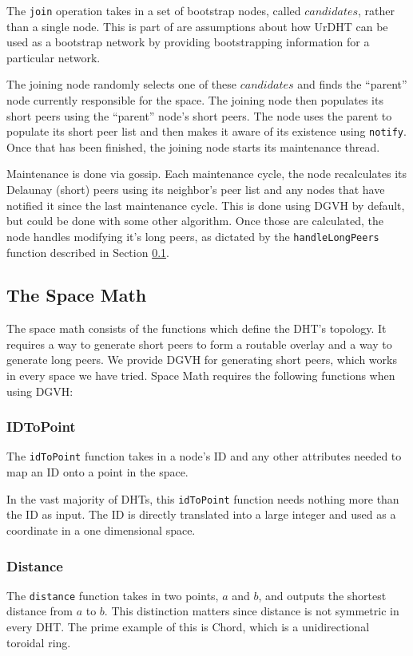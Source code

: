 \documentclass[11pt,conference]{IEEEtran}
\begin{document}
The \texttt{join} operation takes in a set of bootstrap nodes, called $ candidates $, rather than a single node.
This is part of are assumptions about how UrDHT can be used as a bootstrap network by providing bootstrapping information for a particular network.

The joining node randomly selects one of these $ candidates $ and finds the ``parent'' node currently responsible for the space.
The joining node then populates its short peers using the ``parent'' node's short peers.
The node  uses the parent to populate its short peer list and then makes it aware of its existence using \texttt{notify}.
Once that has been finished, the joining node starts its maintenance thread.



Maintenance is done via gossip.
Each maintenance cycle, the node recalculates its Delaunay (short) peers using its neighbor's peer list and any nodes that have notified it since the last maintenance cycle.
This is done using DGVH by default, but could be done with some other algorithm.
Once those are calculated, the node handles modifying it's long peers, as dictated by the \texttt{handleLongPeers} function described in Section \ref{sec:space}.

\subsection{The Space Math}
\label{sec:space}
The space math consists of the functions which define the DHT's topology.
It requires a way to generate short peers to form a routable overlay and a way to generate long peers.
We provide DGVH for generating short peers, which works in every space we have tried.
Space Math requires the following functions when using DGVH:

\subsubsection{IDToPoint}
The \texttt{idToPoint} function takes in a node's ID and any other attributes needed to map an ID onto a point in the space.

In the vast majority of DHTs, this \texttt{idToPoint} function needs nothing more than the ID as input.
The ID is directly translated into a large integer and used as a coordinate in a one dimensional space.


\subsubsection{Distance}
The \texttt{distance} function takes in two points, $a$ and $b$, and outputs the shortest distance from $a$ to $b$.
This distinction matters since distance is not symmetric in every DHT.
The prime example of this is Chord, which is a unidirectional toroidal ring.
\end{document}
